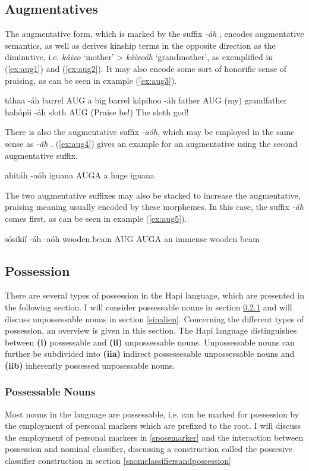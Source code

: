 \documentclass[a4paper, 12pt, oneside]{memoir}
\newcommand{\emh}[1]{\textit{#1}}
\begin{document}
\subsection{Augmentatives}\label{saug}
The augmentative form, which is marked by the suffix \emh{-áh} \Aug, encodes augmentative semantics, as well as derives kinship terms in the opposite direction as the diminutive, i.e. \emh{káixo} `mother' > \emh{káixoáh} `grandmother', as exemplified in (\ref{ex:aug1}) and (\ref{ex:aug2}). It may also encode some sort of honorific sense of praising, as can be seen in example (\ref{ex:aug3}).
\begin{examples}
\ex
\label{ex:aug1}
\bits táhaa -áh 
\gloss barrel AUG
\tr a big barrel
\ex
\label{ex:aug2}
\bits kápihoo -áh
\gloss father AUG
\tr (my) grandfather
\ex
\label{ex:aug3}
\bits hahópìi -áh
\gloss sloth AUG
\tr (Praise be!) The sloth god!
\end{examples}
There is also the augmentative suffix \emh{-aóh}, which may be employed in the same sense as \emh{-áh} \Aug. (\ref{ex:aug4}) gives an example for an augmentative using the second augmentative suffix.
\begin{examples}
\ex 
\label{ex:aug4} 
\bits ahitáh -aóh
\gloss iguana AUGA
\tr a huge iguana
\end{examples}
The two augmentative suffixes may also be stacked to increase the augmentative, praising meaning usually encoded by these morphemes. In this case, the suffix \emh{-áh} comes first, as can be seen in example (\ref{ex:aug5}).
\begin{examples}
\ex
\label{ex:aug5}
\bits sósikíí -áh -aóh
\gloss wooden.beam AUG AUGA
\tr an immense wooden beam
\end{examples}
\subsection{Possession}\label{spossession}
There are several types of possession in the Hapi language, which are presented in the following section. I will consider possessable nouns in section \ref{salien} and will discuss unpossessable nouns in section \ref{sinalien}. Concerning the different types of possession, an overview is given in this section. The Hapi language distinguishes between \textbf{(i)} possessable and \textbf{(ii)} unpossessable nouns. Unpossessable nouns can further be subdivided into \textbf{(iia)} indirect possessesable unpossessable nouns and \textbf{(iib)} inherently possessed unposessable nouns. 
\subsubsection{Possessable Nouns}\label{salien}
Most nouns in the language are possessable, i.e. can be marked for possession by the employment of personal markers which are prefixed to the root. I will discuss the employment of personal markers in \ref{spossmarker} and the interaction between possession and nominal classifier, discussing a construction called the possesive classifier construction in section \ref{snomclassifiersandpossession}
\end{document}
